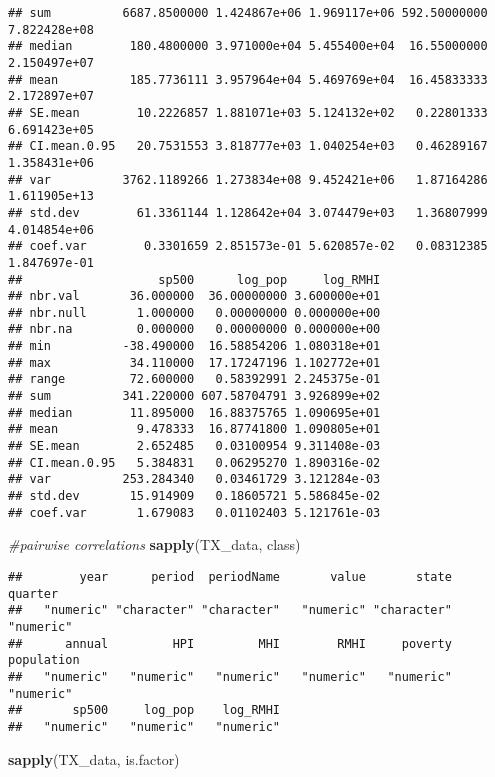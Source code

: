 \documentclass[
]{article}
\newenvironment{Shaded}{\begin{snugshade}}{\end{snugshade}}
\newcommand{\CommentTok}[1]{\textcolor[rgb]{0.56,0.35,0.01}{\textit{#1}}}
\newcommand{\KeywordTok}[1]{\textcolor[rgb]{0.13,0.29,0.53}{\textbf{#1}}}
\newcommand{\NormalTok}[1]{#1}
\begin{document}
\begin{verbatim}
## sum          6687.8500000 1.424867e+06 1.969117e+06 592.50000000 7.822428e+08
## median        180.4800000 3.971000e+04 5.455400e+04  16.55000000 2.150497e+07
## mean          185.7736111 3.957964e+04 5.469769e+04  16.45833333 2.172897e+07
## SE.mean        10.2226857 1.881071e+03 5.124132e+02   0.22801333 6.691423e+05
## CI.mean.0.95   20.7531553 3.818777e+03 1.040254e+03   0.46289167 1.358431e+06
## var          3762.1189266 1.273834e+08 9.452421e+06   1.87164286 1.611905e+13
## std.dev        61.3361144 1.128642e+04 3.074479e+03   1.36807999 4.014854e+06
## coef.var        0.3301659 2.851573e-01 5.620857e-02   0.08312385 1.847697e-01
##                   sp500      log_pop     log_RMHI
## nbr.val       36.000000  36.00000000 3.600000e+01
## nbr.null       1.000000   0.00000000 0.000000e+00
## nbr.na         0.000000   0.00000000 0.000000e+00
## min          -38.490000  16.58854206 1.080318e+01
## max           34.110000  17.17247196 1.102772e+01
## range         72.600000   0.58392991 2.245375e-01
## sum          341.220000 607.58704791 3.926899e+02
## median        11.895000  16.88375765 1.090695e+01
## mean           9.478333  16.87741800 1.090805e+01
## SE.mean        2.652485   0.03100954 9.311408e-03
## CI.mean.0.95   5.384831   0.06295270 1.890316e-02
## var          253.284340   0.03461729 3.121284e-03
## std.dev       15.914909   0.18605721 5.586845e-02
## coef.var       1.679083   0.01102403 5.121761e-03
\end{verbatim}

\begin{Shaded}
\begin{Highlighting}[]
\CommentTok{#pairwise correlations}
\KeywordTok{sapply}\NormalTok{(TX_data, class)}
\end{Highlighting}
\end{Shaded}

\begin{verbatim}
##        year      period  periodName       value       state     quarter 
##   "numeric" "character" "character"   "numeric" "character"   "numeric" 
##      annual         HPI         MHI        RMHI     poverty  population 
##   "numeric"   "numeric"   "numeric"   "numeric"   "numeric"   "numeric" 
##       sp500     log_pop    log_RMHI 
##   "numeric"   "numeric"   "numeric"
\end{verbatim}

\begin{Shaded}
\begin{Highlighting}[]
\KeywordTok{sapply}\NormalTok{(TX_data, is.factor)}
\end{Highlighting}
\end{Shaded}
\end{document}
